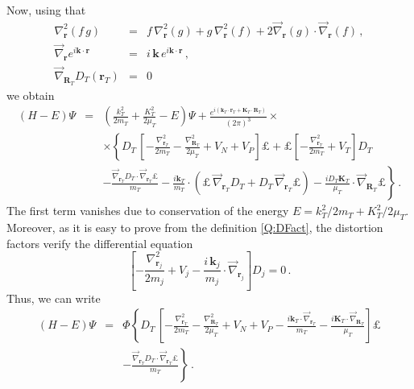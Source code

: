 \noindent Now, using that
\begin{eqnarray*}
\nabla^{2}_{\bm{r}}(f \, g) &=& f \, \nabla^{2}_{\bm{r}}(g) + g \,
\nabla^{2}_{\bm{r}}(f) + 2 \overrightarrow{\nabla}_{\bm{r}}(g) \cdot
\overrightarrow{\nabla}_{\bm{r}}(f) \, , \\
\overrightarrow{\nabla}_{\bm{r}} e^{i \bm{k}\cdot \bm{r}} &=&
i \,
\bm{k} \, e^{i \bm{k}\cdot \bm{r}} \, , \\
\overrightarrow{\nabla}_{\bm{R}_{T}} D_{T}(\bm{r}_{T}) &=& 0
\end{eqnarray*}
 we obtain
%
\begin{eqnarray*}
\left( H - E \right) \Psi &=& \left( \frac{k_{T}^{2}}{2m_{T}} +
\frac{K_{T}^{2}}{2 \mu_{T}} - E \right) \Psi + \frac{e^{ i
(\bm{k}_{T}\cdot \bm{r}_{T} + \bm{K}_{T} \cdot \bm{R}_{T})}}{(2 \pi)^3}
{\times}
\\
&&{\times} \left\{ D_{T} \, \left[ -\frac{\nabla^{2}_{\bm{r}_{T}}}{2 m_{T}}
-\frac{\nabla^{2}_{\bm{R}_{T}}}{2 \mu_{T}}  + V_{N} + V_{P} \right]
\pounds \right. + \pounds \left[-\frac{\nabla^{2}_{\bm{r}_{T}}}{2m_{T}}
+ V_{T} \right] D_{T}
\\
&&\left.-  \frac{ \overrightarrow{\nabla}_{\bm{r}_{T}}D_{T} \cdot
\overrightarrow{\nabla}_{\bm{r}_{T}} \pounds }{m_{T}} - \frac{i
\bm{k}_{T}}{m_{T}} \cdot \left( \pounds \,
\overrightarrow{\nabla}_{\bm{r}_{T}} D_{T} +  D_{T} \,
\overrightarrow{\nabla}_{\bm{r}_{T}}\pounds \right) - \frac{i D_{T}
\bm{K}_{T}}{\mu_{T}} \cdot \overrightarrow{\nabla}_{\bm{R}_{T}} \pounds
  \right\} \, .
\end{eqnarray*}
%
The first term vanishes due to conservation of the energy
$E=k_{T}^{2}/2m_{T} + K_{T}^{2}/2\mu_{T}$. Moreover, as it is easy to
prove from the definition \ref{Q:DFact}, the distortion factors verify
the differential equation
%
\begin{equation}\label{Q:DEDFact}
\left[-\frac{\nabla^{2}_{\bm{r}_{j}}}{2m_{j}} + V_{j} - \frac{ i \,
\bm{k}_{j}}{m_{j}} \cdot
\overrightarrow{\nabla}_{\bm{r}_{j}}\right]D_{j} = 0 \, .
\end{equation}
%
Thus, we can write
\begin{eqnarray}\label{Q:D-pot1}
\left( H - E \right) \Psi &=& \Phi \left\{ D_{T} \, \left[ -
\frac{\nabla^{2}_{\bm{r}_{T}}}{2 m_{T}}
-\frac{\nabla^{2}_{\bm{R}_{T}}}{2 \mu_{T}}  + V_{N} + V_{P} -
\frac{i \bm{k}_{T} \cdot \overrightarrow{\nabla}_{\bm{r}_{T}}
}{m_{T}} - \frac{i \bm{K}_{T} \cdot
\overrightarrow{\nabla}_{\bm{R}_{T}}}{\mu_{T}} \right] \pounds
 \right. \nonumber
\\
&&- \left. \frac{ \overrightarrow{\nabla}_{\bm{r}_{T}}D_{T} \cdot
\overrightarrow{\nabla}_{\bm{r}_{T}} \pounds }{m_{T}}
  \right\} \, .
\end{eqnarray}
